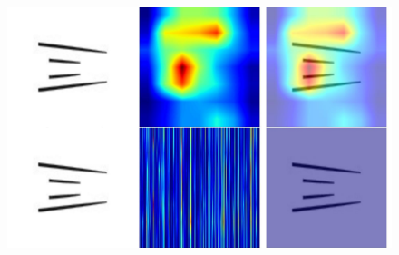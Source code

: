 \documentclass[11pt,a4paper,oneside]{report}
\begin{document}
 \begin{figure}[H]
    \centering
    \includegraphics[width=0.9\linewidth]{Visualizations/Grad-CAM/Proto-Cuneiform/gradcam_ZATU772_combined.pdf}
\end{figure}
\end{document}
